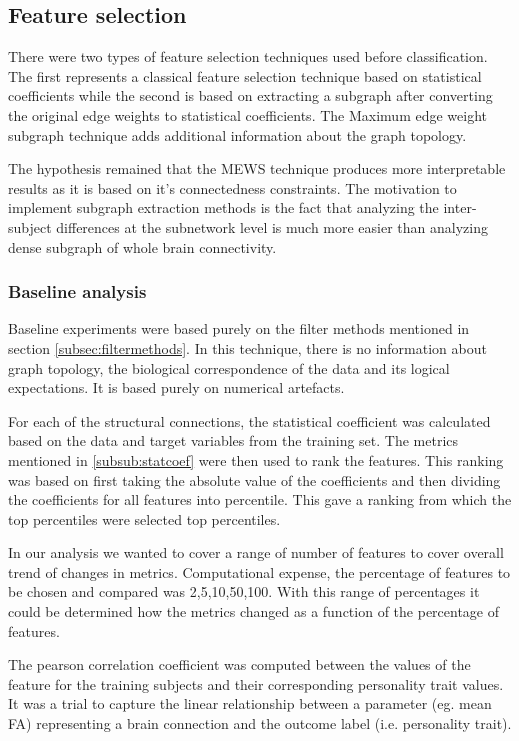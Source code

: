 \documentclass[msthesis.tex]{subfiles}
\begin{document}
\subsection{Feature selection} 
There were two types of feature selection techniques used before classification. The first represents a classical feature selection technique based on statistical coefficients while the second is based on extracting a subgraph after converting the original edge weights to statistical coefficients. The Maximum edge weight subgraph technique adds additional information about the graph topology. 

The hypothesis remained that the MEWS technique produces more interpretable results as it is based on it's connectedness constraints. The motivation to implement subgraph extraction methods is the fact that analyzing the inter-subject differences at the subnetwork level is much more easier than analyzing dense subgraph of whole brain connectivity. 

\subsubsection{Baseline analysis}

Baseline experiments were based purely on the filter methods mentioned in section \ref{subsec:filtermethods}. In this technique, there is no information about graph topology, the biological correspondence of the data and its logical expectations. It is based purely on numerical artefacts. 

For each of the structural connections, the statistical coefficient was calculated based on the data and target variables from the training set. The metrics mentioned in \ref{subsub:statcoef} were then used to rank the features. This ranking was based on first taking the absolute value of the coefficients and then dividing the coefficients for all features into percentile. This gave a ranking from which the top percentiles were selected top percentiles.

In our analysis we wanted to cover a range of number of features to cover overall trend of changes in metrics. Computational expense, the percentage of features to be chosen and compared was 2,5,10,50,100. With this range of percentages it could be determined how the metrics changed as a function of the percentage of features.


\iffalse
The pearson correlation coefficient was computed between the values of the feature for the training subjects and their corresponding personality trait values. It was a trial to capture the linear relationship between a parameter (eg. mean FA) representing a brain connection and the outcome label (i.e. personality trait).
\end{document}
